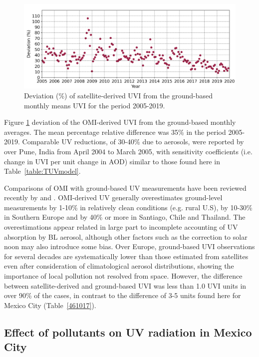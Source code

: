 \documentclass[journal=jacsat,manuscript=article]{achemso}
\begin{document}
\begin{figure}[H]
  \centering
  \includegraphics[scale=0.5]{figures/Monthly_mean_RD.png}
  \caption{Deviation (\%) of satellite-derived UVI from the ground-based monthly means UVI for the period 2005-2019.}
  \label{fig:percentage_relative_difference}
\end{figure}

Figure \ref{fig:percentage_relative_difference} deviation of the OMI-derived UVI from the ground-based monthly averages. The mean percentage relative difference
was 35\% in the period 2005-2019. Comparable UV reductions, of 30-40\% due to aerosols, were reported by
\citet{Panicker_2009} over Pune, India from April 2004 to
March 2005, with sensitivity coefficients (i.e. change in UVI per unit
change in AOD) similar to those found here in Table~\ref{table:TUVmodel}.

Comparisons of OMI with ground-based UV measurements have been reviewed
recently by \citet{Zhang_2019} and \citet{Vitt_2020}.
OMI-derived UV generally overestimates
ground-level measurements by 1-10\% in relatively clean conditions (e.g.
rural U.S), by 10-30\% in Southern Europe and by 40\% or more in
Santiago, Chile\citep{Cabrera_2012} and Thailand\citep{Janjai_2013}. The
overestimations appear related in large part to incomplete accounting of
UV absorption by BL aerosol, although other factors such as the
correction to solar noon may also introduce some
bias.\citep{Zhang_2019} Over Europe, ground-based UVI observations for
several decades are systematically lower than those estimated from
satellites even after consideration of climatological aerosol
distributions, showing the importance of local pollution not resolved
from space.\citep{Vitt_2020} However, the difference between
satellite-derived and ground-based UVI was less than 1.0 UVI units in
over 90\% of the cases, in contrast to the difference of 3-5 units found
here for Mexico City (Table~{\ref{461017}}).

\subsection{Effect of pollutants on UV radiation in Mexico City}
\end{document}
